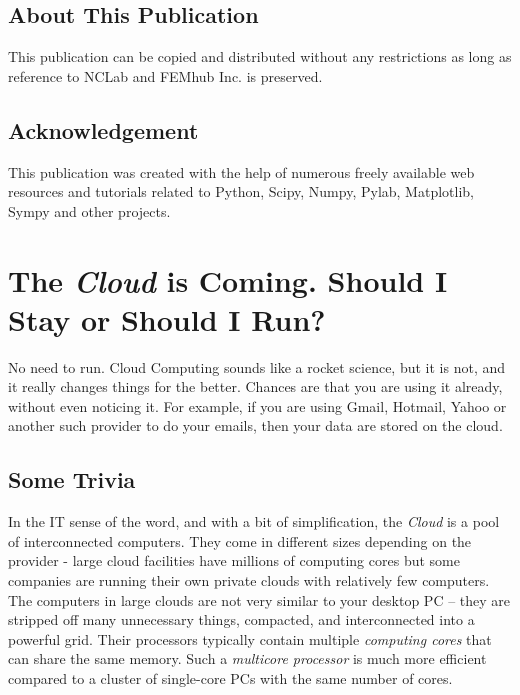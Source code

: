 \documentclass[article,A4,12pt]{llncs}
\begin{document}
\subsection*{About This Publication}
This publication can be copied and distributed without any restrictions
as long as reference to NCLab and FEMhub Inc. is preserved.

\subsection*{Acknowledgement}
This publication was created with the help of numerous freely 
available web resources and tutorials related to Python, Scipy,
Numpy, Pylab, Matplotlib, Sympy and other projects.

\normalsize

\newpage
\setcounter{tocdepth}{2}
\tableofcontents

\newpage

\pagestyle{plain}
\setcounter{page}{1}


\section{The {\em Cloud} is Coming. Should I Stay or Should I Run?}

No need to run. Cloud Computing sounds like a rocket science, but it is not,
and it really changes things for the better. Chances are that you are using 
it already, without even noticing it. For example, if you are using Gmail, 
Hotmail, Yahoo or another such provider to do your emails, then your data are 
stored on the cloud. 

\subsection{Some Trivia}

In the IT sense of the word, and with a bit of simplification, the {\em Cloud} 
is a pool of interconnected computers. They come in different sizes depending on the provider - 
large cloud facilities have millions of computing cores but some companies are running 
their own private clouds with relatively few computers. The computers in large clouds
are not very similar to your desktop PC -- they are stripped off many unnecessary 
things, compacted, and interconnected into a powerful grid. Their processors 
typically contain multiple {\em computing cores} that can share the same memory.
Such a {\em multicore processor} is much more efficient compared to a cluster 
of single-core PCs with the same number of cores.
\end{document}
